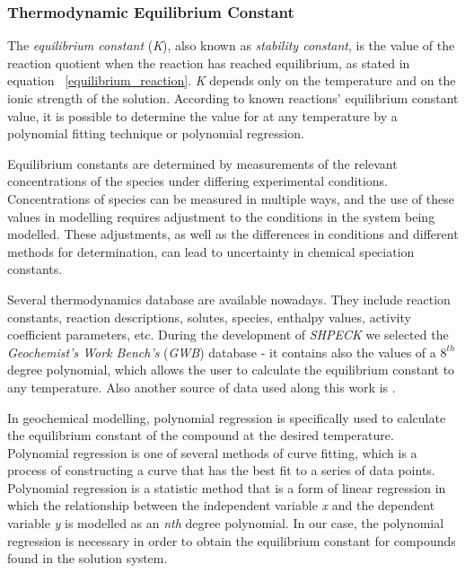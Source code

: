 \documentclass[ppgc,mestrado,English]{iiufrgs}
\begin{document}
\subsubsection{Thermodynamic Equilibrium Constant}
The \emph{equilibrium constant} (\emph{K}), also known as \emph{stability constant}, is the value of the reaction quotient when the reaction has reached equilibrium, as stated in equation ~\ref{equilibrium_reaction}. \emph{K} depends only on the temperature and on the ionic strength of the solution. According to known reactions' equilibrium constant value, it is possible to determine the value for at any temperature by a polynomial fitting technique or polynomial regression.

Equilibrium constants are determined by measurements of the relevant concentrations of the species under differing experimental conditions. Concentrations of species can be measured in multiple ways, and the use of these values in modelling requires adjustment to the conditions in the system being modelled. These adjustments, as well as the differences in conditions and different methods for determination, can lead to uncertainty in chemical speciation constants.

Several thermodynamics database are available nowadays. They include reaction constants, reaction descriptions, solutes, species, enthalpy values, activity coefficient parameters, etc. During the development of \emph{SHPECK} we selected the \emph{Geochemist's Work Bench's} (\emph{GWB}) database - it contains also the values of a $8^{th}$ degree polynomial, which allows the user to calculate the equilibrium constant to any temperature. Also another source of data used along this work is \cite{Palandri:04}.

In geochemical modelling, polynomial regression is specifically used to calculate the equilibrium constant of the compound at the desired temperature. 
Polynomial regression is one of several methods of curve fitting, which is a process of constructing a curve that has the best fit to a series of data points. Polynomial regression is a statistic method that is a form of linear regression in which the relationship between the independent variable \emph{x} and the dependent variable \emph{y} is modelled as an \emph{nth} degree polynomial. In our case, the polynomial regression is necessary in order to obtain the equilibrium constant for compounds found in the solution system.

\end{document}
